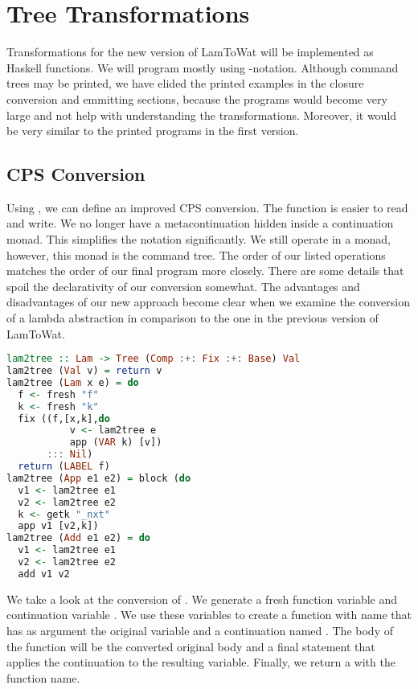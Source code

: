 \section{\label{section:treensforms}Tree Transformations}
Transformations for the new version of LamToWat will be implemented as Haskell functions. We will program mostly using -notation. Although command trees may be printed, we have elided the printed examples in the closure conversion and emmitting sections, because the programs would become very large and not help with understanding the transformations. Moreover, it would be very similar to the printed programs in the first version.

\subsection{\label{subsection:cpsconvert2}CPS Conversion}
Using , we can define an improved CPS conversion. The function is easier to read and write. We no longer have a metacontinuation hidden inside a continuation monad. This simplifies the notation significantly. We still operate in a monad, however, this monad is the command tree. The order of our listed operations matches the order of our final program more closely. There are some details that spoil the declarativity of our conversion somewhat. The advantages and disadvantages of our new approach become clear when we examine the conversion of a lambda abstraction in comparison to the one in the previous version of LamToWat.

\begin{lstlisting}[language=Haskell]
lam2tree :: Lam -> Tree (Comp :+: Fix :+: Base) Val
lam2tree (Val v) = return v
lam2tree (Lam x e) = do
  f <- fresh "f"
  k <- fresh "k"
  fix ((f,[x,k],do
           v <- lam2tree e
           app (VAR k) [v])
       ::: Nil)
  return (LABEL f)
lam2tree (App e1 e2) = block (do
  v1 <- lam2tree e1
  v2 <- lam2tree e2
  k <- getk "_nxt"
  app v1 [v2,k])
lam2tree (Add e1 e2) = do
  v1 <- lam2tree e1
  v2 <- lam2tree e2
  add v1 v2
\end{lstlisting}

We take a look at the conversion of . We generate a fresh function variable  and continuation variable . We use these variables to create a function with name  that has as argument the original variable and a continuation named . The body of the function will be the converted original body and a final statement that applies the continuation to the resulting variable. Finally, we return a  with the function name.

